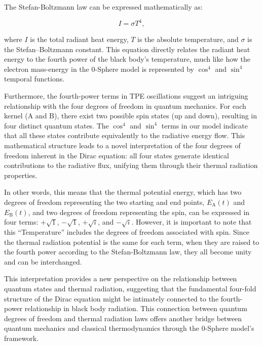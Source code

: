 \documentclass[%
 reprint,
 amsmath,amssymb,
 aps,
]{revtex4-1}
\numberwithin{equation}{section}%
\begin{document}
The Stefan-Boltzmann law can be expressed mathematically as:

\begin{equation}
    I = \sigma T^4,
\end{equation}

\noindent where $I$ is the total radiant heat energy, $T$ is the absolute temperature, and $\sigma$ is the Stefan–Boltzmann constant. This equation directly relates the radiant heat energy to the fourth power of the black body's temperature, much like how the electron mass-energy in the 0-Sphere model is represented by $\cos^4$ and $\sin^4$ temporal functions.

Furthermore, the fourth-power terms in TPE oscillations suggest an intriguing relationship with the four degrees of freedom in quantum mechanics. For each kernel (A and B), there exist two possible spin states (up and down), resulting in four distinct quantum states. The $\cos^4$ and $\sin^4$ terms in our model indicate that all these states contribute equivalently to the radiative energy flow. This mathematical structure leads to a novel interpretation of the four degrees of freedom inherent in the Dirac equation: all four states generate identical contributions to the radiative flux, unifying them through their thermal radiation properties.

In other words, this means that the thermal potential energy, which has two degrees of freedom representing the two starting and end points, $E_{\mathrm{A}}(t)$ and $E_{\mathrm{B}}(t)$, and two degrees of freedom representing the spin, can be expressed in four terms: $+\sqrt{1}$, $-\sqrt{1}$, $+\sqrt{i}$, and $-\sqrt{i}$. However, it is important to note that this ``Temperature'' includes the degrees of freedom associated with spin. Since the thermal radiation potential is the same for each term, when they are raised to the fourth power according to the Stefan-Boltzmann law, they all become unity and can be interchanged.

This interpretation provides a new perspective on the relationship between quantum states and thermal radiation, suggesting that the fundamental four-fold structure of the Dirac equation might be intimately connected to the fourth-power relationship in black body radiation. This connection between quantum degrees of freedom and thermal radiation laws offers another bridge between quantum mechanics and classical thermodynamics through the 0-Sphere model's framework.


\end{document}
